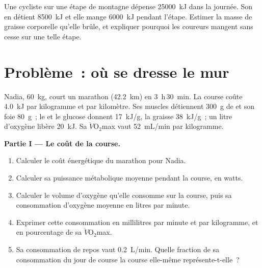 \begin{exercise}[$\star\star\star$]\label{exo:g10:exercise-and-energy:15}
Une cycliste sur une étape de montagne dépense \qty{25000}{kJ} dans la
journée. Son  en détient \qty{8500}{kJ} et elle mange
\qty{6000}{kJ} pendant l'étape. Estimer la masse de graisse corporelle
qu'elle brûle, et expliquer pourquoi les coureurs mangent sans cesse
sur une telle étape.
\end{exercise}

\section{Problème~: où se dresse le mur}

\begin{problem}
\label{pb:g10:exercise-and-energy:1}
Nadia, \qty{60}{kg}, court un marathon (\qty{42.2}{km}) en
\qty{3}{h}\,\qty{30}{min}. La course coûte \qty{4.0}{kJ} par kilogramme
et par kilomètre. Ses muscles détiennent \qty{300}{g} de  et
son foie \qty{80}{g}~; le  et le glucose donnent
\qty{17}{kJ/g}, la graisse \qty{38}{kJ/g}~; un litre d'oxygène libère
\qty{20}{kJ}. Sa $\dot V\!\mathrm{O_2}$max vaut \qty{52}{mL/min} par
kilogramme.

\medskip
\noindent\textbf{Partie I --- Le coût de la course.}
\begin{enumerate}
  \item Calculer le coût énergétique du marathon pour Nadia.
  \item Calculer sa puissance métabolique moyenne pendant la course,
        en watts.
  \item Calculer le volume d'oxygène qu'elle consomme sur la course,
        puis sa consommation d'oxygène moyenne en litres par minute.
  \item Exprimer cette consommation en millilitres par minute et par
        kilogramme, et en pourcentage de sa
        $\dot V\!\mathrm{O_2}$max.
  \item Sa consommation de repos vaut \qty{0.2}{L/min}. Quelle
        fraction de sa consommation du jour de course la course
        elle-même représente-t-elle~?
\end{enumerate}


\end{problem}
